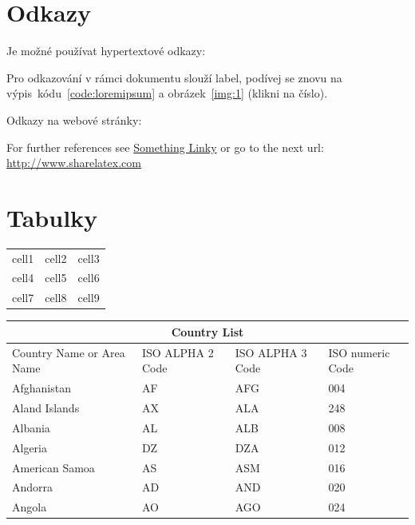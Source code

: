 \section{Odkazy}

Je možné používat hypertextové odkazy:

\vspace{0.5cm}
\noindent Pro odkazování v rámci dokumentu slouží label, podívej se znovu na výpis~kódu~\ref{code:loremipsum} a obrázek~\ref{img:1} (klikni na číslo).

\vspace{0.5cm}
\noindent Odkazy na webové stránky:

\noindent For further references see \href{http://www.sharelatex.com}{Something Linky} 
or go to the next url: \url{http://www.sharelatex.com}

\section{Tabulky}

\begin{center}
\begin{tabular}{ c c c }
 cell1 & cell2 & cell3 \\ 
 cell4 & cell5 & cell6 \\  
 cell7 & cell8 & cell9    
\end{tabular}
\end{center}

\begin{center}
\begin{tabular}{ |p{3cm}||p{3cm}|p{3cm}|p{3cm}|  }
 \hline
 \multicolumn{4}{|c|}{Country List} \\
 \hline
 Country Name     or Area Name& ISO ALPHA 2 Code &ISO ALPHA 3 Code&ISO numeric Code\\
 \hline
 Afghanistan   & AF    &AFG&   004\\
 Aland Islands&   AX  & ALA   &248\\
 Albania &AL & ALB&  008\\
 Algeria    &DZ & DZA&  012\\
 American Samoa&   AS  & ASM&016\\
 Andorra& AD  & AND   &020\\
 Angola& AO  & AGO&024\\
 \hline
\end{tabular}
\end{center}